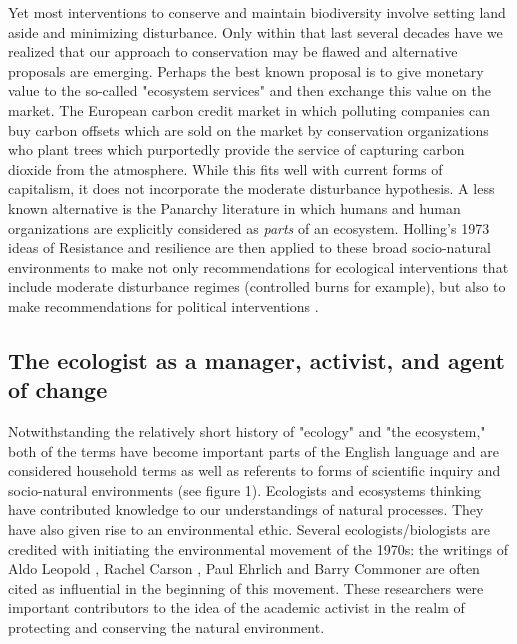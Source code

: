 Yet most interventions to conserve and maintain biodiversity involve setting land aside and minimizing disturbance. Only within that last several decades have we realized that our approach to conservation may be flawed and alternative proposals are emerging. Perhaps the best known proposal is to give monetary value to the so-called "ecosystem services" and then exchange this value on the market. The European carbon credit market in which polluting companies can buy carbon offsets which are sold on the market by conservation organizations who plant trees which purportedly provide the service of capturing carbon dioxide from the atmosphere. While this fits well with current forms of capitalism, it does not incorporate the moderate disturbance hypothesis. A less known alternative is the Panarchy literature in which humans and human organizations are explicitly considered as \textit{parts} of an ecosystem. Holling's 1973 ideas of Resistance and resilience are then applied to these broad socio-natural environments to make not only recommendations for ecological interventions that include moderate disturbance regimes (controlled burns for example), but also to make recommendations for political interventions \citep{holling_2002}.

\subsection{The ecologist as a manager, activist, and agent of change}

 Notwithstanding the relatively short history of "ecology" and "the ecosystem," both of the terms have become important parts of the English language and are considered household terms as well as referents to forms of scientific inquiry and socio-natural environments (see figure 1). Ecologists and ecosystems thinking have contributed knowledge to our understandings of natural processes. They have also given rise to an environmental ethic. Several ecologists/biologists are credited with initiating the environmental movement of the 1970s: the writings of Aldo Leopold \citep{leopold_1949}, Rachel Carson \citep{carson_1962}, Paul Ehrlich \citep{ehrlich_1968} and Barry Commoner \citep{commoner_1971} are often cited as influential in the beginning of this movement. These researchers were important contributors to the idea of the academic activist in the realm of protecting and conserving the natural environment. 
 
